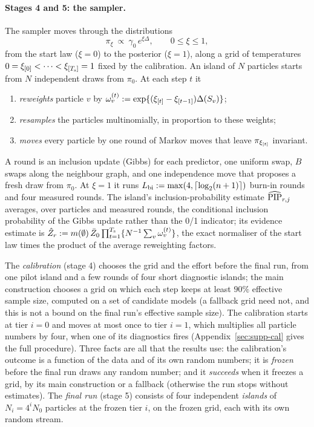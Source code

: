 \paragraph{Stages 4 and 5: the sampler.} The sampler moves through the distributions
\begin{equation}\label{eq:path}
  \pi_\xi\ \propto\ \gamma_0\,e^{\xi\Delta},\qquad 0\le\xi\le1,
\end{equation}
from the start law ($\xi=0$) to the posterior ($\xi=1$), along a grid of temperatures $0=\xi_{[0]}<\dots<\xi_{[T_{\mathrm s}]}=1$ fixed
by the calibration. An island of $N$ particles starts from $N$ independent draws from $\pi_0$. At each step $t$ it
\begin{enumerate}[label=(\alph*),leftmargin=2em,itemsep=0pt,topsep=2pt]
  \item \emph{reweights} particle $v$ by $\omega^{(t)}_v:=\exp\{(\xi_{[t]}-\xi_{[t-1]})\Delta(S_v)\}$;
  \item \emph{resamples} the particles multinomially, in proportion to these weights;
  \item \emph{moves} every particle by one round of Markov moves that leave $\pi_{\xi_{[t]}}$ invariant.
\end{enumerate}
A round is an inclusion update (Gibbs) for each predictor, one uniform swap, $B$ swaps along the neighbour graph, and one
independence move that proposes a fresh draw from $\pi_0$. At $\xi=1$ it runs $L_{\mathrm{bi}}:=\max(4,\lceil\log_2(n+1)\rceil)$ burn-in rounds
and four measured rounds. The island's inclusion-probability estimate $\widehat{\mathrm{PIP}}_{r,j}$ averages, over particles and measured
rounds, the conditional inclusion probability of the Gibbs update rather than the 0/1 indicator; its evidence estimate is
$\hat Z_r:=m(\emptyset)\,\bar Z_0\prod_{t=1}^{T_{\mathrm s}}\{N^{-1}\sum_v\omega^{(t)}_v\}$, the exact normaliser of the start law times
the product of the average reweighting factors.

The \emph{calibration} (stage 4) chooses the grid and the effort before the final run, from one pilot island and a few
rounds of four short diagnostic islands; the main construction chooses a grid on which each step keeps at least $90\%$
effective sample size, computed on a set of candidate models (a fallback grid need not, and this is not a bound on the
final run's effective sample size). The calibration starts at
tier $i=0$ and moves at most once to tier $i=1$, which multiplies all particle numbers by four, when one of its
diagnostics fires (Appendix~\ref{sec:supp-cal} gives the full procedure). Three facts are all that the results use: the calibration's outcome is a function of the data and of its own
random numbers; it is \emph{frozen} before the final run draws any random number; and it \emph{succeeds} when it freezes a
grid, by its main construction or a fallback (otherwise the run stops without estimates). The \emph{final run} (stage 5)
consists of four independent \emph{islands} of $N_i=4^iN_0$ particles at the frozen tier $i$, on the frozen grid, each with
its own random stream.

